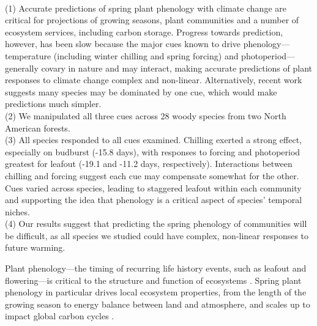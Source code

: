\documentclass[11pt]{article}
\begin{document}
\newpage %
\\
(1) Accurate predictions of spring plant phenology with climate change are critical for projections of growing seasons, plant communities and a number of ecosystem services, including carbon storage. Progress towards prediction, however, has been slow because the major cues known to drive phenology---temperature (including  winter chilling and spring forcing) and photoperiod---generally covary in nature and may interact, making accurate predictions of plant responses to climate change complex and non-linear. Alternatively, recent work suggests many species may be dominated by one cue, which would make predictions much simpler. \\
(2) We manipulated all three cues across 28 woody species from two North American forests.\\
(3) All species responded to all cues examined. Chilling exerted a strong effect, especially on budburst (-15.8 days), with responses to forcing and photoperiod greatest for leafout (-19.1 and -11.2 days, respectively). Interactions between chilling and forcing suggest each cue may compensate somewhat for the other. Cues varied across species, leading to staggered leafout within each community and supporting the idea that phenology is a critical aspect of species' temporal niches. \\
(4) Our results suggest that predicting the spring phenology of communities will be difficult, as all species we studied could have complex, non-linear responses to future warming. 

\newpage

Plant phenology---the timing of recurring life history events, such as leafout and flowering---is critical to the structure and function of ecosystems \citep{Cleland:2007aa}. Spring plant phenology in particular drives local ecosystem properties, from the length of the growing season to energy balance between land and atmosphere, and scales up to impact global carbon cycles \citep{Richardson:2009aa}. %
\end{document}
